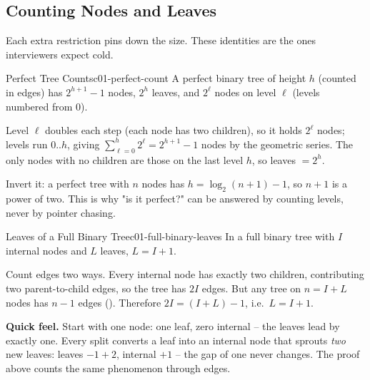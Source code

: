 
\subsection{Counting Nodes and Leaves}

Each extra restriction pins down the size. These identities are the ones interviewers
expect cold.

\begin{theorem}{Perfect Tree Counts}{c01-perfect-count}
A perfect binary tree of height $h$ (counted in edges) has $2^{h+1}-1$ nodes, $2^{h}$
leaves, and $2^{\ell}$ nodes on level $\ell$ (levels numbered from $0$).
\end{theorem}
\begin{proofbox}
Level $\ell$ doubles each step (each node has two children), so it holds $2^{\ell}$ nodes;
levels run $0..h$, giving $\sum_{\ell=0}^{h} 2^{\ell} = 2^{h+1}-1$ nodes by the geometric
series. The only nodes with no children are those on the last level $h$, so leaves $=2^{h}$.
\end{proofbox}
\begin{insightbox}
Invert it: a perfect tree with $n$ nodes has $h = \log_2(n+1)-1$, so $n+1$ is a power of
two. This is why "is it perfect?" can be answered by counting levels, never by pointer
chasing.
\end{insightbox}

\begin{theorem}{Leaves of a Full Binary Tree}{c01-full-binary-leaves}
In a full binary tree with $I$ internal nodes and $L$ leaves, $L = I + 1$.
\end{theorem}
\begin{proofbox}
Count edges two ways. Every internal node has exactly two children, contributing two
parent-to-child edges, so the tree has $2I$ edges. But any tree on $n = I + L$ nodes has
$n-1$ edges (). Therefore $2I = (I+L)-1$, i.e.\ $L = I + 1$.
\end{proofbox}

\noindent\textbf{Quick feel.} Start with one node: one leaf, zero internal -- the leaves
lead by exactly one. Every split converts a leaf into an internal node that sprouts
\emph{two} new leaves: leaves $-1+2$, internal $+1$ -- the gap of one never changes. The
proof above counts the same phenomenon through edges.

